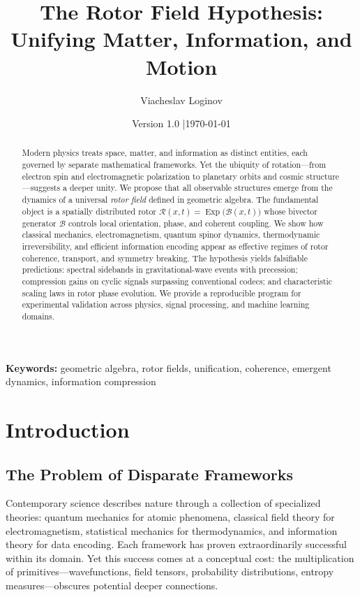 \documentclass[11pt,a4paper]{article}
\title{\textbf{The Rotor Field Hypothesis: Unifying Matter, Information, and Motion}}
\author[1]{Viacheslav Loginov}
\affil[1]{Kyiv, Ukraine\\ \texttt{barthez.slavik@gmail.com}}
\date{\small Version 1.0 \quad|\quad \today}
\newcommand{\Exp}{\operatorname{Exp}}
\newcommand{\Rotor}{\mathcal{R}}
\newcommand{\Biv}{\mathcal{B}}
\theoremstyle{definition}
\theoremstyle{plain}
\theoremstyle{remark}
\begin{document}
\maketitle

\begin{abstract}
\noindent
Modern physics treats space, matter, and information as distinct entities, each governed by separate mathematical frameworks. Yet the ubiquity of rotation---from electron spin and electromagnetic polarization to planetary orbits and cosmic structure---suggests a deeper unity. We propose that all observable structures emerge from the dynamics of a universal \emph{rotor field} defined in geometric algebra. The fundamental object is a spatially distributed rotor $\Rotor(x,t)=\Exp\!\big(\Biv(x,t)\big)$ whose bivector generator $\Biv$ controls local orientation, phase, and coherent coupling. We show how classical mechanics, electromagnetism, quantum spinor dynamics, thermodynamic irreversibility, and efficient information encoding appear as effective regimes of rotor coherence, transport, and symmetry breaking. The hypothesis yields falsifiable predictions: spectral sidebands in gravitational-wave events with precession; compression gains on cyclic signals surpassing conventional codecs; and characteristic scaling laws in rotor phase evolution. We provide a reproducible program for experimental validation across physics, signal processing, and machine learning domains.
\end{abstract}

\noindent\textbf{Keywords:} geometric algebra, rotor fields, unification, coherence, emergent dynamics, information compression

\vspace{1em}

\section{Introduction}

\subsection{The Problem of Disparate Frameworks}

Contemporary science describes nature through a collection of specialized theories: quantum mechanics for atomic phenomena, classical field theory for electromagnetism, statistical mechanics for thermodynamics, and information theory for data encoding. Each framework has proven extraordinarily successful within its domain. Yet this success comes at a conceptual cost: the multiplication of primitives---wavefunctions, field tensors, probability distributions, entropy measures---obscures potential deeper connections.
\end{document}
